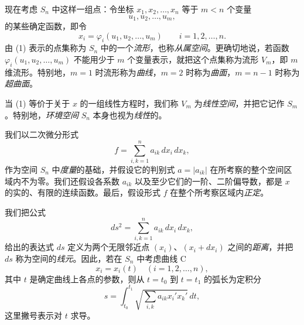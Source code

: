 现在考虑 \(S_n\) 中这样一组点：令坐标 \(x_1,x_2,\ldots,x_n\) 等于 \(m<n\) 个变量
\[
 u_1,u_2,\ldots,u_m,
\]
的某些确定函数，即令
\begin{equation}\tag{1}
 x_i=\varphi_i(u_1,u_2,\ldots,u_m)\qquad i=1,2,\ldots,n.
\end{equation}
由 (1) 表示的点集称为 \(S_n\) 中的一个\emph{流形}，也称\emph{从属空间}。更确切地说，若函数 \(\varphi_i(u_1,u_2,\ldots,u_m)\) 不能用少于 \(m\) 个变量表示，就把这个点集称为流形 \(V_m\)，即 \(m\) 维流形。特别地，\(m=1\) 时流形称为\emph{曲线}，\(m=2\) 时称为\emph{曲面}，\(m=n-1\) 时称为\emph{超曲面}。

当 (1) 等价于关于 \(x\) 的一组线性方程时，我们称 \(V_m\) 为\emph{线性空间}，并把它记作 \(S_m\)。特别地，\emph{环境空间} \(S_n\) 本身也视为\emph{线性}的。

我们以二次微分形式
\[
 f=\sum_{i,k=1}^{n} a_{ik}\,dx_i\,dx_k,
\]
作为空间 \(S_n\) 中\emph{度量}的基础，并假设它的判别式 \(a=|a_{ik}|\) 在所考察的整个空间区域内不为零。我们还假设各系数 \(a_{ik}\) 以及至少它们的一阶、二阶偏导数，都是 \(x\) 的实的、有限的连续函数。最后，假设形式 \(f\) 在整个所考察区域内\emph{正定}。

我们把公式
\begin{equation}\tag{2}
 ds^2=\sum_{i,k=1}^{n} a_{ik}\,dx_i\,dx_k,
\end{equation}
给出的表达式 \(ds\) 定义为两个无限邻近点 \((x_i)\)、\((x_i+dx_i)\) 之间的\emph{距离}，并把 \(ds\) 称为空间的\emph{线元}。因此，若在 \(S_n\) 中考虑曲线 C
\[
 x_i=x_i(t)\quad(i=1,2,\ldots,n),
\]
其中 \(t\) 是确定曲线上各点的参数，则从 \(t=t_0\) 到 \(t=t_1\) 的弧长为定积分
\[
 s=\int_{t_0}^{t_1}\sqrt{\sum_{i,k}a_{ik}x_i'x_k'}\,dt,
\]
这里撇号表示对 \(t\) 求导。

